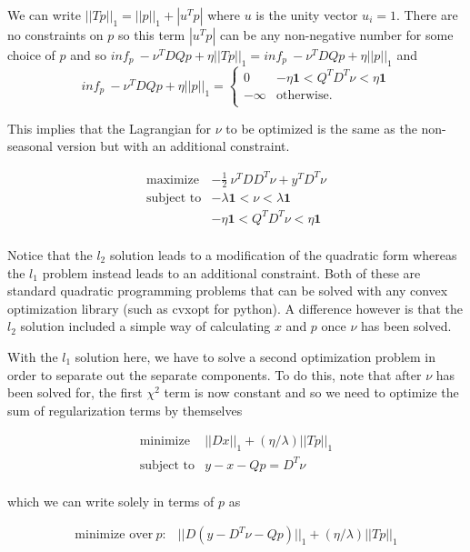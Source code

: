 \documentclass{article}
\begin{document}
We can write $||T p||_1 = ||p||_1 + |u^T p| $ where $u$ is the unity vector $u_i=1$. There are no constraints on
$p$ so this term $|u^T p|$ can be any non-negative number for some choice of $p$ and so
$inf_{p} ~  -\nu^T D Q p + \eta ||T p||_1 = inf_{p} ~  -\nu^T D Q p + \eta ||p||_1 $ and
\[
inf_{p} ~  -\nu^T D Q p + \eta ||p||_1 =
    \left\{
    \begin{array}{ll}
    0 &  - \eta \mathbf{1} <  Q^T D^T \nu < \eta \mathbf{1} \\
  -\infty  & \mbox{otherwise.} \\
  \end{array}
  \right.
\]

This implies that the Lagrangian for $\nu$ to be optimized is the same as the non-seasonal
version but with an additional constraint.

\begin{eqnarray}
\mbox{maximize} & - \frac{1}{2} ~ \nu^T D D^T \nu + y^T D^T \nu \\
\mbox{subject to} & - \lambda \mathbf{1} < \nu < \lambda \mathbf{1} \\
& - \eta \mathbf{1} < Q^T D^T \nu < \eta \mathbf{1} \\
\end{eqnarray}

Notice that the $l_2$ solution leads to a modification of the quadratic form whereas the
$l_1$ problem instead leads to an additional constraint. Both of these are standard quadratic
programming problems that can be solved with any convex optimization library (such as cvxopt for python).
A difference however is that the $l_2$ solution included a simple way of calculating $x$ and $p$ once
$\nu$ has been solved.

With the $l_1$ solution here, we have to solve a second optimization problem
in order to separate out the separate components. To do this, note that after $\nu$ has been solved for,
the first $\chi^2$ term is now constant
and so we need to optimize the sum of regularization terms by themselves

\begin{eqnarray}
\mbox{minimize} & ||D x||_1 + (\eta / \lambda) ||T p||_1 \\
\mbox{subject to} & y - x - Qp = D^T \nu \\
\end{eqnarray}

which we can write solely in terms of $p$ as

\begin{eqnarray}
\mbox{minimize over} ~p : & ||D (y - D^T \nu - Q p)||_1 + (\eta/\lambda) ||T p||_1 \\
\end{eqnarray}
\end{document}
